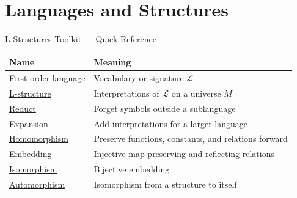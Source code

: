 \section{Languages and Structures}

\begin{toolkitbox}{L-Structures Toolkit --- Quick Reference}
\small
\begin{tabular}{l l}
\toprule
\textbf{Name}  & \textbf{Meaning} \\
\midrule
\hyperref[def:first-order-language]{First-order language} & Vocabulary or signature $\mathcal{L}$ \\
\hyperref[def:l-structure]{L-structure} & Interpretations of $\mathcal{L}$ on a universe $M$ \\
\hyperref[def:l-structure-reduct]{Reduct} & Forget symbols outside a sublanguage \\
\hyperref[def:l-structure-expansion]{Expansion} & Add interpretations for a larger language \\
\hyperref[def:l-structure-homomorphism]{Homomorphism} & Preserve functions, constants, and relations forward \\
\hyperref[def:l-structure-embedding]{Embedding} & Injective map preserving and reflecting relations \\
\hyperref[def:l-structure-isomorphism]{Isomorphism} & Bijective embedding \\
\hyperref[def:l-structure-automorphism]{Automorphism} & Isomorphism from a structure to itself \\
\bottomrule
\end{tabular}
\end{toolkitbox}




